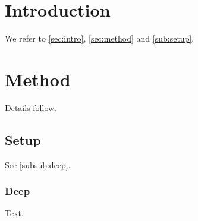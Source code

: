\documentclass{article}
\begin{document}
\section{Introduction}\label{sec:intro}
We refer to \autoref{sec:intro}, \autoref{sec:method} and \autoref{sub:setup}.
\section{Method}\label{sec:method}
Details follow.
\subsection{Setup}\label{sub:setup}
See \autoref{subsub:deep}.
\subsubsection{Deep}\label{subsub:deep}
Text.
\end{document}
